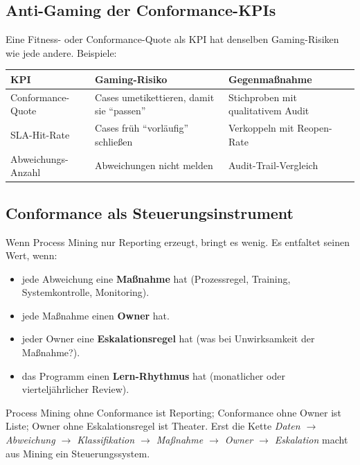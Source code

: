 \documentclass[11pt,a4paper,oneside]{article}
\newcommand{\fachbegriff}[1]{\textbf{#1}}
\begin{document}
\subsection{Anti-Gaming der Conformance-KPIs}

Eine Fitness- oder Conformance-Quote als KPI hat denselben Gaming-Risiken wie jede andere. Beispiele:

\begin{tabularx}{\linewidth}{@{}lXX@{}}
\toprule
KPI & Gaming-Risiko & Gegenmaßnahme \\
\midrule
Conformance-Quote & Cases umetikettieren, damit sie ``passen'' & Stichproben mit qualitativem Audit \\
SLA-Hit-Rate & Cases früh ``vorläufig'' schließen & Verkoppeln mit Reopen-Rate \\
Abweichungs-Anzahl & Abweichungen nicht melden & Audit-Trail-Vergleich \\
\bottomrule
\end{tabularx}

\medskip

\subsection{Conformance als Steuerungsinstrument}

Wenn Process Mining nur Reporting erzeugt, bringt es wenig. Es entfaltet seinen Wert, wenn:

\begin{itemize}
  \item jede Abweichung eine \fachbegriff{Maßnahme} hat (Prozessregel, Training, Systemkontrolle, Monitoring).
  \item jede Maßnahme einen \fachbegriff{Owner} hat.
  \item jeder Owner eine \fachbegriff{Eskalationsregel} hat (was bei Unwirksamkeit der Maßnahme?).
  \item das Programm einen \fachbegriff{Lern-Rhythmus} hat (monatlicher oder vierteljährlicher Review).
\end{itemize}

\begin{merkbox}
Process Mining ohne Conformance ist Reporting; Conformance ohne Owner ist Liste; Owner ohne Eskalationsregel ist Theater. Erst die Kette \emph{Daten $\rightarrow$ Abweichung $\rightarrow$ Klassifikation $\rightarrow$ Maßnahme $\rightarrow$ Owner $\rightarrow$ Eskalation} macht aus Mining ein Steuerungssystem.
\end{merkbox}
\end{document}
